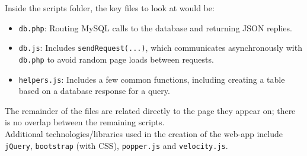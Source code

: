 \documentclass{article}
\begin{document}
Inside the scripts folder, the key files to look at would be:
\begin{itemize}
    \item \texttt{db.php}: Routing MySQL calls to the database and returning JSON replies.
    \item \texttt{db.js}: Includes \texttt{sendRequest(...)}, which communicates asynchronously with \texttt{db.php} to avoid random page loads between requests.
    \item \texttt{helpers.js}: Includes a few common functions, including creating a table based on a database response for a query.
\end{itemize}
The remainder of the files are related directly to the page they appear on; there is no overlap between the remaining scripts.\\

Additional technologies/libraries used in the creation of the web-app include \texttt{jQuery}, \texttt{bootstrap} (with CSS), \texttt{popper.js} and \texttt{velocity.js}.
\end{document}
